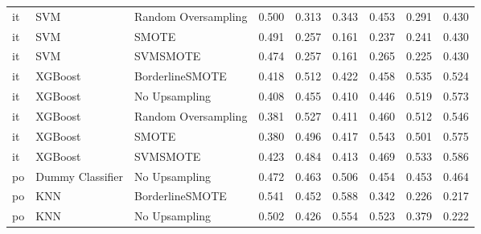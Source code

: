 \begin{tabular}{lllllllll}
      it &                          SVM & Random Oversampling & 0.500 &                     0.313 &                 0.343 &                  0.453 &                                   0.291 &     0.430 \\
      it &                          SVM &               SMOTE & 0.491 &                     0.257 &                 0.161 &                  0.237 &                                   0.241 &     0.430 \\
      it &                          SVM &            SVMSMOTE & 0.474 &                     0.257 &                 0.161 &                  0.265 &                                   0.225 &     0.430 \\
      it &                      XGBoost &     BorderlineSMOTE & 0.418 &                     0.512 &                 0.422 &                  0.458 &                                   0.535 &     0.524 \\
      it &                      XGBoost &       No Upsampling & 0.408 &                     0.455 &                 0.410 &                  0.446 &                                   0.519 &     0.573 \\
      it &                      XGBoost & Random Oversampling & 0.381 &                     0.527 &                 0.411 &                  0.460 &                                   0.512 &     0.546 \\
      it &                      XGBoost &               SMOTE & 0.380 &                     0.496 &                 0.417 &                  0.543 &                                   0.501 &     0.575 \\
      it &                      XGBoost &            SVMSMOTE & 0.423 &                     0.484 &                 0.413 &                  0.469 &                                   0.533 &     0.586 \\
      po &             Dummy Classifier &       No Upsampling & 0.472 &                     0.463 &                 0.506 &                  0.454 &                                   0.453 &     0.464 \\
      po &                          KNN &     BorderlineSMOTE & 0.541 &                     0.452 &                 0.588 &                  0.342 &                                   0.226 &     0.217 \\
      po &                          KNN &       No Upsampling & 0.502 &                     0.426 &                 0.554 &                  0.523 &                                   0.379 &     0.222 \\

\end{tabular}

